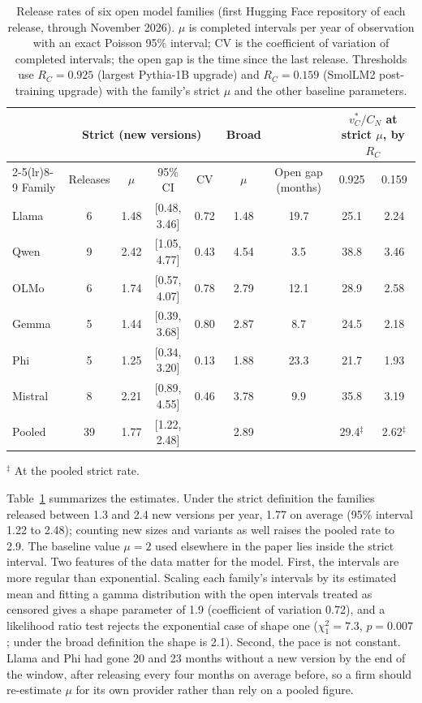 \documentclass[ijds,nonblindrev]{informs4}
\begin{document}
\begin{table}[t]
\centering
\caption{Release rates of six open model families (first Hugging Face repository of each release, through November 2026). $\mu$ is completed intervals per year of observation with an exact Poisson 95\% interval; CV is the coefficient of variation of completed intervals; the open gap is the time since the last release. Thresholds use $R_C=0.925$ (largest Pythia-1B upgrade) and $R_C=0.159$ (SmolLM2 post-training upgrade) with the family's strict $\mu$ and the other baseline parameters.}\label{tab:releases}
\small
\begin{tabular}{lcccccccc}
\toprule
 & \multicolumn{4}{c}{Strict (new versions)} & Broad & & \multicolumn{2}{c}{$v^*_C/C_N$ at strict $\mu$, by $R_C$}\\
\cmidrule(lr){2-5}\cmidrule(lr){8-9}
Family & Releases & $\mu$ & 95\% CI & CV & $\mu$ & Open gap (months) & 0.925 & 0.159\\
\midrule
Llama & 6 & 1.48 & [0.48, 3.46] & 0.72 & 1.48 & 19.7 & 25.1 & 2.24\\
Qwen & 9 & 2.42 & [1.05, 4.77] & 0.43 & 4.54 & 3.5 & 38.8 & 3.46\\
OLMo & 6 & 1.74 & [0.57, 4.07] & 0.78 & 2.79 & 12.1 & 28.9 & 2.58\\
Gemma & 5 & 1.44 & [0.39, 3.68] & 0.80 & 2.87 & 8.7 & 24.5 & 2.18\\
Phi & 5 & 1.25 & [0.34, 3.20] & 0.13 & 1.88 & 23.3 & 21.7 & 1.93\\
Mistral & 8 & 2.21 & [0.89, 4.55] & 0.46 & 3.78 & 9.9 & 35.8 & 3.19\\
\midrule
Pooled & 39 & 1.77 & [1.22, 2.48] & & 2.89 & & 29.4$^\ddagger$ & 2.62$^\ddagger$\\
\bottomrule
\end{tabular}

\smallskip\footnotesize $^\ddagger$ At the pooled strict rate.
\end{table}

Table~\ref{tab:releases} summarizes the estimates. Under the strict definition the families released between 1.3 and 2.4 new versions per year, 1.77 on average (95\% interval 1.22 to 2.48); counting new sizes and variants as well raises the pooled rate to 2.9. The baseline value $\mu=2$ used elsewhere in the paper lies inside the strict interval. Two features of the data matter for the model. First, the intervals are more regular than exponential. Scaling each family's intervals by its estimated mean and fitting a gamma distribution with the open intervals treated as censored gives a shape parameter of 1.9 (coefficient of variation 0.72), and a likelihood ratio test rejects the exponential case of shape one ($\chi^2_1=7.3$, $p=0.007$; under the broad definition the shape is 2.1). Second, the pace is not constant. Llama and Phi had gone 20 and 23 months without a new version by the end of the window, after releasing every four months on average before, so a firm should re-estimate $\mu$ for its own provider rather than rely on a pooled figure.
\end{document}
